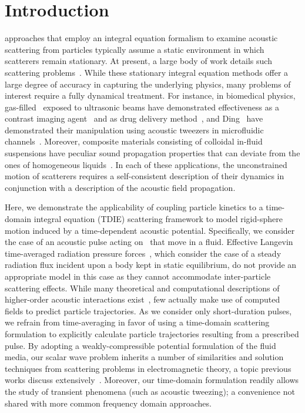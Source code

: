 \section{Introduction}

 approaches that employ an integral equation formalism to examine acoustic scattering from particles typically assume a static environment in which scatterers remain stationary.
At present, a large body of work details such scattering problems~\cite{Waterman1969, Ding1989, Ye1997}.
While these stationary integral equation methods offer a large degree of accuracy in capturing the underlying physics, many problems of interest require a fully dynamical treatment.
For instance, in biomedical physics, gas-filled \bubbles\ exposed to ultrasonic beams have demonstrated effectiveness as a contrast imaging agent~\cite{Blomley2001} and as drug delivery method~\cite{Allen2002,Hernot2008}, and Ding \etal\ have demonstrated their manipulation using acoustic tweezers in microfluidic channels~\cite{Ding2012}.
Moreover, composite materials consisting of colloidal in-fluid suspensions have peculiar sound propagation properties that can deviate from the ones of homogeneous liquids~\cite{Ye1993}.
In each of these applications, the unconstrained motion of scatterers requires a self-consistent description of their dynamics in conjunction with a description of the acoustic field propagation.

Here, we demonstrate the applicability of coupling particle kinetics to a time-domain integral equation (TDIE) scattering framework to model rigid-sphere motion induced by a time-dependent acoustic potential.
Specifically, we consider the case of an acoustic pulse acting on \bubbles\ that move in a fluid.
Effective Langevin time-averaged radiation pressure forces~\cite{King1934, Borgnis1953}, which consider the case of a steady radiation flux incident upon a body kept in static equilibrium, do not provide an appropriate model in this case as they cannot accommodate inter-particle scattering effects.
While many theoretical and computational descriptions of higher-order acoustic interactions exist~\cite{Gumerov2002, Doinikov2004, Doinikov2005, Ilinskii2007, Azizoglu2009}, few actually make use of computed fields to predict particle trajectories.
As we consider only short-duration pulses, we refrain from time-averaging in favor of using a time-domain scattering formulation to explicitly calculate particle trajectories resulting from a prescribed pulse.
By adopting a weakly-compressible potential formulation of the fluid media, our scalar wave problem inherits a number of similarities and solution techniques from scattering problems in electromagnetic theory, a topic previous works discuss extensively~\cite{Tsang1998,Gumerov2002,Li2014}.
Moreover, our time-domain formulation readily allows the study of transient phenomena (such as acoustic tweezing); a convenience not shared with more common frequency domain approaches.

